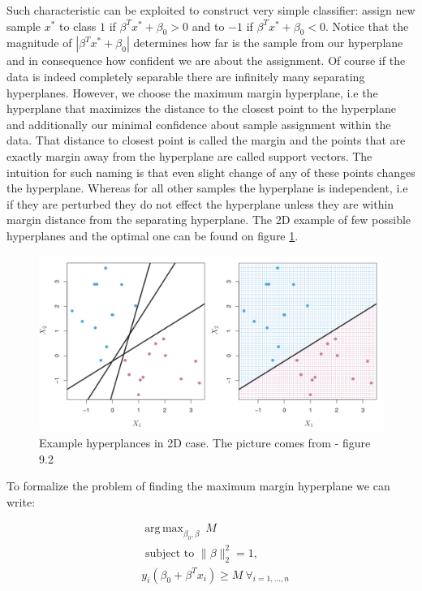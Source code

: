 \documentclass[12pt, wide]{mwart}
\DeclareMathOperator*{\argmax}{arg\,max}
\begin{document}
Such characteristic can be exploited to construct very simple classifier: assign new sample $x^*$ to class $1$ if $\beta^T x^* + \beta_0 > 0$ and to $-1$ if $\beta^T x^* + \beta_0 < 0$. Notice that the magnitude of $|\beta^T x^* + \beta_0|$ determines how far is the sample from our hyperplane and in consequence how confident we are about the assignment. Of course if the data is indeed completely separable there are infinitely many separating hyperplanes. However, we choose the maximum margin hyperplane, i.e the hyperplane that maximizes the distance to the closest point to the hyperplane and additionally our minimal confidence about sample assignment within the data. That distance to closest point is called the margin and the points that are exactly margin away from the hyperplane are called support vectors. The intuition for such naming is that even slight change of any of these points changes the hyperplane. Whereas for all other samples the hyperplane is independent, i.e if they are perturbed they do not effect the hyperplane unless they are within margin distance from the separating hyperplane. The 2D example of few possible hyperplanes and the optimal one can be found on figure \ref{fig:svc-hyper}.

\begin{figure}
\centering
\includegraphics[width=\textwidth]{images/svc-hyper.png}
\caption{Example hyperplances in 2D case. The picture comes from \cite{ISL} - figure 9.2}
\label{fig:svc-hyper}
\end{figure}

To formalize the problem of finding the maximum margin hyperplane we can write:

\begin{align*}
&{\argmax_{\beta_{0}, \beta} \ M} \\ &{\text { subject to } \|\beta\|_2^2 = 1}, \\ &{y_{i}\left(\beta_{0}+\beta^T x_i\right) \geq M \ \forall_{i=1, \ldots, n}}
\end{align*}
\end{document}
